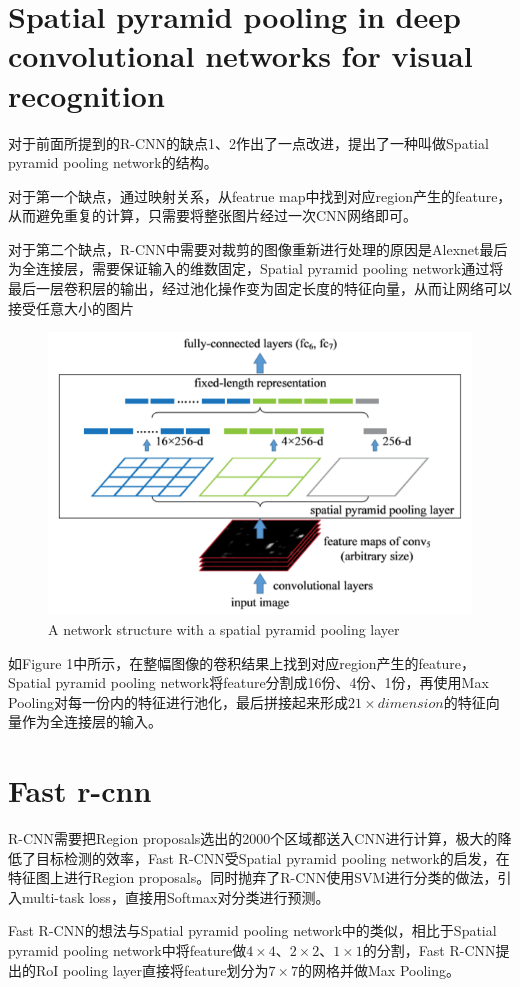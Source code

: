 \documentclass[12pt,onecolumn]{article}
\begin{document}
    \section{Spatial pyramid pooling in deep convolutional networks for visual recognition\cite{he2015spatial}}
    对于前面所提到的R-CNN的缺点1、2作出了一点改进，提出了一种叫做Spatial pyramid pooling network的结构。\par 
    对于第一个缺点，通过映射关系，从featrue map中找到对应region产生的feature，从而避免重复的计算，只需要将整张图片经过一次CNN网络即可。\par
    对于第二个缺点，R-CNN中需要对裁剪的图像重新进行处理的原因是Alexnet最后为全连接层，需要保证输入的维数固定，Spatial pyramid pooling network通过将最后一层卷积层的输出，经过池化操作变为固定长度的特征向量，从而让网络可以接受任意大小的图片\par
    \begin{figure}[ht]
        \centering
        \includegraphics[width=\linewidth]{figure/spp.png}
        \caption{A network structure with a spatial pyramid pooling layer}
    \end{figure}
    如Figure 1中所示，在整幅图像的卷积结果上找到对应region产生的feature，Spatial pyramid pooling network将feature分割成16份、4份、1份，再使用Max Pooling对每一份内的特征进行池化，最后拼接起来形成$21\times dimension$的特征向量作为全连接层的输入。
    
    \section{Fast r-cnn\cite{girshick2015fast}}
    R-CNN需要把Region proposals选出的2000个区域都送入CNN进行计算，极大的降低了目标检测的效率，Fast R-CNN受Spatial pyramid pooling network的启发，在特征图上进行Region proposals。同时抛弃了R-CNN使用SVM进行分类的做法，引入multi-task loss，直接用Softmax对分类进行预测。\par
    Fast R-CNN的想法与Spatial pyramid pooling network中的类似，相比于Spatial pyramid pooling network中将feature做$4\times 4$、$2\times 2$、$1\times 1$的分割，Fast R-CNN提出的RoI pooling layer直接将feature划分为$7\times 7$的网格并做Max Pooling。
\end{document}
